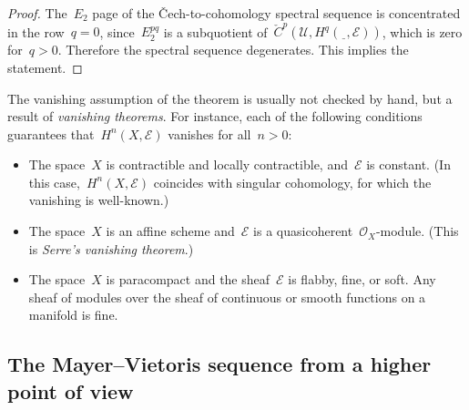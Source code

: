 \documentclass[10pt]{amsart}
\theoremstyle{definition}
\theoremstyle{plain}
\theoremstyle{remark}
\newcommand{\E}{\mathcal{E}}
\renewcommand{\O}{\mathcal{O}}
\newcommand{\U}{\mathcal{U}}
\newcommand{\spot}{\underline{\ \ }}
\begin{document}
\begin{proof}The~$E_2$ page of the Čech-to-cohomology spectral sequence is
concentrated in the row~$q = 0$, since~$E_2^{pq}$ is a subquotient of~$\check
C^p(\U, H^q(\spot,\E))$, which is zero for~$q > 0$. Therefore the spectral
sequence degenerates. This implies the statement.
\end{proof}

The vanishing assumption of the theorem is usually not checked by hand, but a
result of \emph{vanishing theorems}. For instance, each of the following
conditions guarantees that~$H^n(X,\E)$ vanishes for all~$n > 0$:
\begin{itemize}
\item The space~$X$ is contractible and locally contractible, and~$\E$ is
constant. (In this case,~$H^n(X,\E)$ coincides with singular cohomology, for
which the vanishing is well-known.)
\item The space~$X$ is an affine scheme and~$\E$ is a
quasicoherent~$\O_X$-module. (This is \emph{Serre's vanishing theorem}.)
\item The space~$X$ is paracompact and the sheaf~$\E$ is flabby, fine, or soft.
Any sheaf of modules over the sheaf of continuous or smooth functions on a
manifold is fine.
\end{itemize}


\subsection{The Mayer--Vietoris sequence from a higher point of view}
\end{document}
